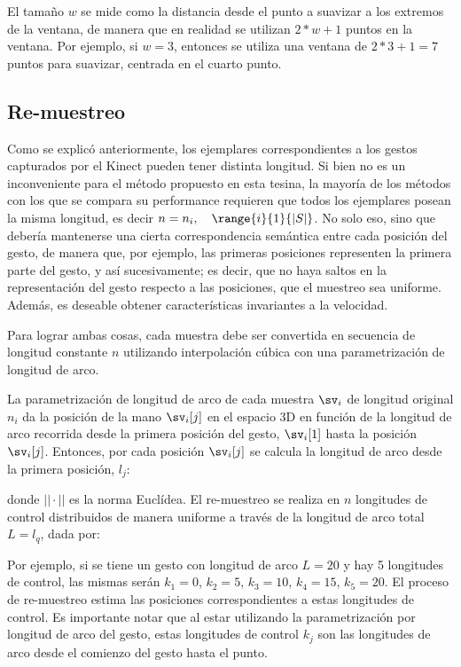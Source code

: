 El tamaño $w$ se mide como la distancia desde el punto a suavizar a los extremos de la ventana, de manera que en realidad se utilizan $2*w+1$ puntos en la ventana. Por ejemplo, si $w=3$, entonces se utiliza una ventana de $2*3+1=7$ puntos para suavizar, centrada en el cuarto punto.


\subsection{Re-muestreo}

Como se explicó anteriormente, los ejemplares correspondientes a los gestos capturados por el Kinect pueden tener distinta longitud. Si bien no es un inconveniente para el método propuesto en esta tesina, la mayoría de los métodos con los que se compara su performance requieren que todos los ejemplares posean la misma longitud, es decir $n=n_i, \quad \range{i}{1}{|S|}$. No solo eso, sino que debería mantenerse una cierta correspondencia semántica entre cada posición del gesto, de manera que, por ejemplo, las primeras posiciones representen la primera parte del gesto, y así sucesivamente; es decir, que no haya saltos en la representación del gesto respecto a las posiciones, que el muestreo sea uniforme. Además, es deseable obtener características invariantes a la velocidad. 

Para lograr ambas cosas, cada muestra debe ser convertida en secuencia de longitud constante $n$ utilizando interpolación cúbica con una parametrización de longitud de arco. 

La parametrización de longitud de arco de cada muestra $\sv_i$ de longitud original $n_i$ da la posición de la mano $\sv_i[j]$ en el espacio 3D en función de la longitud de arco recorrida desde la primera posición del gesto, $\sv_i[1]$ hasta la posición $\sv_i[j]$. Entonces, por cada posición $\sv_i[j]$  se calcula la longitud de arco desde la primera posición, $l_j$:
 

donde $||\cdot||$ es la norma Euclídea. El re-muestreo se realiza en $n$ longitudes de control distribuidos de manera uniforme a través de la longitud de arco total $L=l_{q}$, dada por: 


Por ejemplo, si se tiene un gesto con longitud de arco $L=20$ y hay 5 longitudes de control, las mismas serán $k_1=0$, $k_2=5$, $k_3=10$, $k_4=15$, $k_5=20$. El proceso de re-muestreo estima las posiciones correspondientes a estas longitudes de control. Es importante notar que al estar utilizando la parametrización por longitud de arco del gesto, estas longitudes de control $k_j$ son las longitudes de arco desde el comienzo del gesto hasta el punto.


